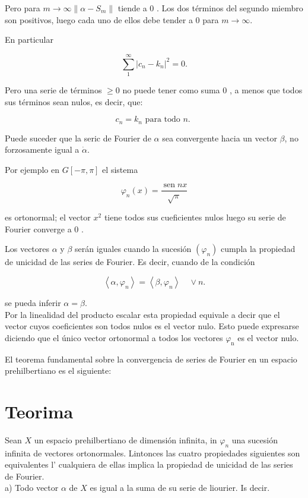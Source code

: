 \documentclass[10pt]{article}
\theoremstyle{plain}
\theoremstyle{definition}
\theoremstyle{remark}
\begin{document}
Pero para $m \rightarrow \infty\left\|\alpha-S_{m}\right\|$ tiende a 0 . Los dos términos del segundo miembro son positivos, luego cada uno de ellos debe tender a 0 para $m \rightarrow \infty$.

En particular

$$
\sum_{1}^{\infty}\left|c_{n}-k_{n}\right|^{2}=0 .
$$

Pero una serie de términos $\geqslant 0$ no puede tener como suma 0 , a menos que todos sus términos sean nulos, es decir, que:

$$
c_{n}=k_{n} \text { para todo } n \text {. }
$$

Puede suceder que la seric de Fourier de $\alpha$ sea convergente hacia un vector $\beta$, no forzosamente igual a $\dot{\alpha}$.

Por ejemplo en $G[-\pi, \pi]$ el sistema

$$
\varphi_{n}(x)=\frac{\operatorname{sen} n x}{\sqrt{\pi}}
$$

es ortonormal; el vector $x^{2}$ tiene todos sus cueficientes nulos luego su serie de Fourier converge a 0 .

Los vectores $\alpha$ y $\beta$ serán iguales cuando la sucesión $\left(\varphi_{n}\right)$ cumpla la propiedad de unicidad de las series de Fourier. Es decir, cuando de la condición

$$
\left\langle\alpha, \varphi_{n}\right\rangle=\left\langle\beta, \varphi_{n}\right\rangle \quad \vee n .
$$

se pueda inferir $\alpha=\beta$.\\
Por la linealidad del producto escalar esta propiedad equivale a decir que el vector cuyos coeficientes son todos nulos es el vector nulo. Esto puede expresarse diciendo que el único vector ortonormal a todos los vectores $\varphi_{\mathrm{n}}$ es el vector nulo.

El teorema fundamental sobre la convergencia de series de Fourier en un espacio prehilbertiano es el siguiente:

\section*{Teorima}
Sean $X$ un espacio prehilbertiano de dimensión infinita, in $\varphi_{n}$ una sucesión infinita de vectores ortonormales. Lintonces las cuatro propiedades siguientes son equivalentes l' cualquiera de ellas implica la propiedad de unicidad de las series de Fourier.\\
a) Todo vector $\alpha$ de $X$ es igual a la suma de su serie de liourier. Is decir.
\end{document}
